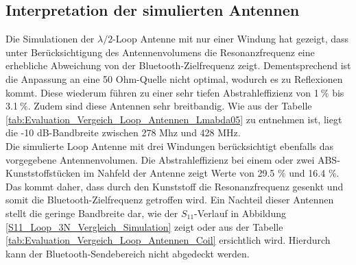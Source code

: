 \subsection{Interpretation der simulierten Antennen}
Die Simulationen der $\lambda/2$-Loop Antenne mit nur einer Windung hat gezeigt, dass unter Berücksichtigung des Antennenvolumens die Resonanzfrequenz eine erhebliche Abweichung von der Bluetooth-Zielfrequenz zeigt. Dementsprechend ist die Anpassung an eine 50 Ohm-Quelle nicht optimal, wodurch es zu Reflexionen kommt. Diese wiederum führen zu einer sehr tiefen Abstrahleffizienz von 1$\ \% $ bis 3.1$\ \%$. Zudem sind diese Antennen sehr breitbandig. Wie aus der Tabelle \ref{tab:Evaluation_Vergeich_Loop_Antennen_Lmabda05} zu entnehmen ist, liegt die -10 dB-Bandbreite zwischen 278 Mhz und 428 MHz.\\
Die simulierte Loop Antenne mit drei Windungen berücksichtigt ebenfalls das vorgegebene Antennenvolumen. Die Abstrahleffizienz bei einem oder zwei ABS-Kunststoffstücken im Nahfeld der Antenne zeigt Werte von 29.5 $\%$ und 16.4 $\%$. Das kommt daher, dass durch den Kunststoff die Resonanzfrequenz gesenkt und somit die Bluetooth-Zielfrequenz getroffen wird. Ein Nachteil dieser Antennen stellt die geringe Bandbreite dar, wie der $S_{11}$-Verlauf in Abbildung \ref{S11_Loop_3N_Vergleich_Simulation} zeigt oder aus der Tabelle \ref{tab:Evaluation_Vergeich_Loop_Antennen_Coil} ersichtlich wird. Hierdurch kann der Bluetooth-Sendebereich nicht abgedeckt werden.

\newpage
